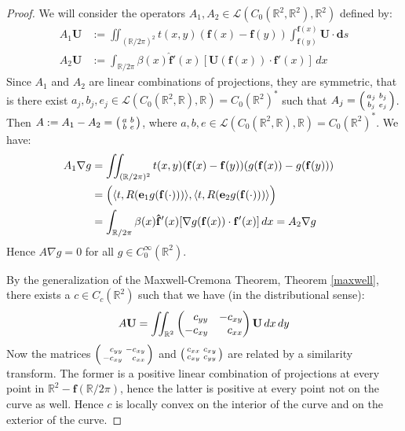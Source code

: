 \documentclass{amsart}
\newcommand{\R}			{\mathbb R}
\newcommand{\U}			{\mathbf U}
\newcommand{\f}			{\mathbf f}
\newcommand{\e}			{\mathbf e}
\newcommand{\dd}		{\mathbf d}
\newcommand{\Lin}		{\mathcal L}
\newcommand{\grad}		{\nabla}
\numberwithin{equation}{section}
\begin{document}
\begin{proof}
We will consider the operators $A_1,A_2\in\Lin(C_0(\R^2,\R^2),\R^2)$ 
defined by:
\begin{align}
A_1\U&:=\iint_{(\R/2\pi)^2}t(x,y)(\f(x)-\f(y))
\int_{\f(y)}^{\f(x)}\U\cdot\dd s\\
A_2\U&:=\int_{\R/2\pi}\beta(x)\mathbf{\hat f}'(x)[\U(\f(x))\cdot\f'(x)]\,dx
\end{align}
Since $A_1$ and $A_2$ are linear combinations of projections, they 
are symmetric, that is there exist $a_j,b_j,e_j\in\Lin(C_0(\R^2,\R),\R)=C_0(\R^2)^*$ 
such that $A_j=\left(\smallmatrix a_j&b_j\cr b_j&e_j\endsmallmatrix\right)$.  
Then $A:=A_1-A_2=\left(\smallmatrix a&b\cr b&e\endsmallmatrix\right)$, 
where $a,b,e\in\Lin(C_0(\R^2,\R),\R)=C_0(\R^2)^*$.  We have:
\begin{equation}
\begin{split}
A_1\grad g&=\iint_{(\R/2\pi)^2}t(x,y)(\f(x)-\f(y))(g(\f(x))-g(\f(y)))\cr
&=\Bigl(\langle t,R(\e_1g(\f(\cdot)))\rangle,\langle t,R(\e_2g(\f(\cdot)))\rangle\Bigr)\cr
&=\int_{\R/2\pi}\beta(x)\mathbf{\hat f}'(x)[\grad g(\f(x))\cdot\f'(x)]\,dx=A_2\grad g
\end{split}
\end{equation}
Hence $A\grad g=0$ for all $g\in C_0^\infty(\R^2)$.

By the generalization of the Maxwell-Cremona Theorem, 
Theorem \ref{maxwell}, there exists a $c\in C_c(\R^2)$ 
such that we have (in the distributional sense):
\begin{equation}
A\U=\iint_{\R^2}\left(\begin{matrix}\hfill c_{yy}&-c_{xy}\cr-c_{xy}&\hfill c_{xx}\end{matrix}\right)\U\,dx\,dy
\end{equation}
Now the matrices $\left(\begin{smallmatrix}\hfill c_{yy}&-c_{xy}\cr
-c_{xy}&\hfill c_{xx}\end{smallmatrix}\right)$ and 
$\left(\begin{smallmatrix}c_{xx}&c_{xy}\cr
c_{xy}&c_{yy}\end{smallmatrix}\right)$ are 
related by a similarity transform.  The former is 
a positive linear combination of projections at 
every point in $\R^2-\f(\R/2\pi)$, hence the latter 
is positive at every point not on the curve as well.  Hence 
$c$ is locally convex on the interior of the curve 
and on the exterior of the curve.


\end{proof}
\end{document}
